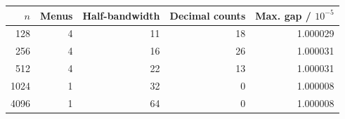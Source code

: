 \begin{tabular}{rrrrr}\toprule
$n$ & Menus & Half-bandwidth & Decimal counts & Max. gap / $10^{-5}$\\\midrule
128 & 4 & 11 & 18 & 1.000029 \\
256 & 4 & 16 & 26 & 1.000031 \\
512 & 4 & 22 & 13 & 1.000031 \\
1024 & 1 & 32 & 0 & 1.000008 \\
4096 & 1 & 64 & 0 & 1.000008 \\
\bottomrule\end{tabular}
